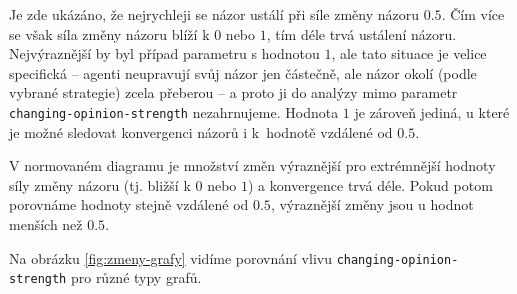 \documentclass[10pt,a4paper]{report}
\begin{document}
Je zde ukázáno, že nejrychleji se názor ustálí při síle změny názoru $0.5$. Čím více se však síla změny názoru blíží k $0$ nebo $1$, tím déle trvá ustálení názoru. Nejvýraznější by byl případ parametru s hodnotou $1$, ale tato situace je velice specifická -- agenti neupravují svůj názor jen částečně, ale názor okolí (podle vybrané strategie) zcela přeberou -- a proto ji do analýzy mimo parametr \texttt{changing-opinion-strength} nezahrnujeme. Hodnota $1$ je zároveň jediná, u které je možné sledovat konvergenci názorů i k~hodnotě vzdálené od $0.5$.

V normovaném diagramu je množství změn výraznější pro extrémnější hodnoty síly změny názoru (tj. bližší k $0$ nebo $1$) a konvergence trvá déle. Pokud potom porovnáme hodnoty stejně vzdálené od $0.5$, výraznější změny jsou u hodnot menších než $0.5$. 

Na obrázku \ref{fig:zmeny-grafy} vidíme porovnání vlivu \texttt{changing-opinion-strength} pro různé typy grafů.
\end{document}
